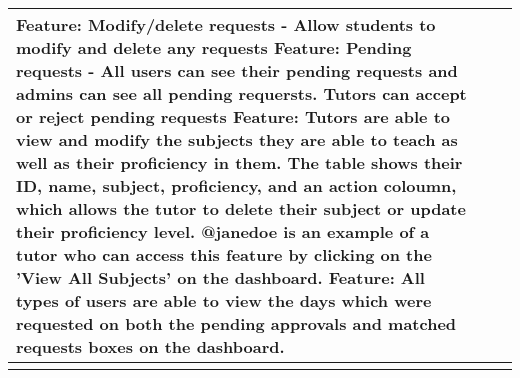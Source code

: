 \documentclass[11pt,a4paper]{article}
\begin{document}
\begin{tabular}{|p{50mm}|p{40mm}|p{50mm}|}
 \hline
Feature: Modify/delete requests - Allow students to modify and delete any requests
 \hline
Feature: Pending requests - All users can see their pending requests and admins can see all pending requersts. Tutors can accept or reject pending requests
 \hline
 Feature: Tutors are able to view and modify the subjects they are able to teach as well as their proficiency in them. The table shows their ID, name, subject, proficiency, and an action coloumn, which allows the tutor to delete their subject or update their proficiency level. @janedoe is an example of a tutor who can access this feature by clicking on the 'View All Subjects' on the dashboard. 
 \hline
 Feature: All types of users are able to view the days which were requested on both the pending approvals and matched requests boxes on the dashboard.
 \hline
  & & \\
 \hline
  & & \\
 \hline
\end{tabular}
\end{document}
